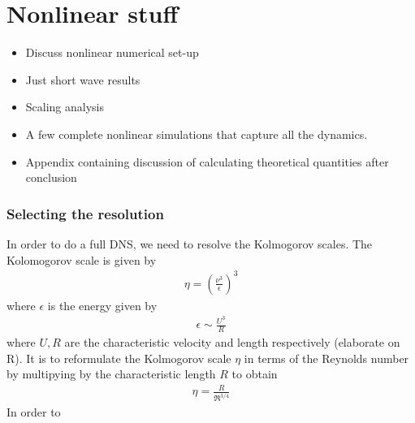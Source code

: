 %
% 
%
%
%
%
%
%
%
%
%
%
%
%
%
%
\chapter{Nonlinear stuff}

\begin{itemize}
\item Discuss nonlinear numerical set-up
\item Just short wave results
\item Scaling analysis 
\item A few complete nonlinear simulations that capture all the dynamics.
\item Appendix containing discussion of calculating theoretical quantities after conclusion
\end{itemize}

\subsection{Selecting the resolution}

In order to do a full DNS, we need to resolve the Kolmogorov scales. The Kolomogorov scale is given by
\begin{align}
\eta = \left(\frac{\nu^{3}}{\epsilon}\right)^{3}
\end{align}
where $\epsilon$ is the energy given by
\begin{align}
\epsilon \sim \frac{U^{3}}{R} 
\end{align}
where $U,R$ are the characteristic velocity and length respectively (elaborate on R). It is to reformulate the Kolmogorov scale $\eta$ in terms of the Reynolds number by multipying by the characteristic length  $R$ to obtain
\begin{align}
\eta = \frac{R}{\Re^{3/4}}
\end{align}
In order to 


